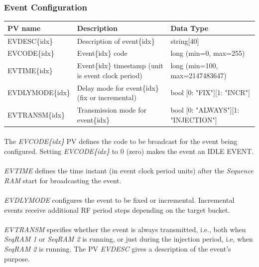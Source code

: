 \documentclass[openany]{article}
\begin{document}
		\subsubsection{Event Configuration}\label{pvgroup:evg-event}
			\begin{center}
			\begin{tabular}{| m{2.8cm} m{6cm} m{6cm} |}
			    \hline
			    \bfseries PV name & \bfseries Description & \bfseries Data Type \\ \hline
			    EVDESC\{idx\} & Description of event\{idx\} & string[40] \\ \hline
			    EVCODE\{idx\} & Event\{idx\} code & long (min=0, max=255) \\ \hline
			    EVTIME\{idx\} & Event\{idx\} timestamp (unit is event clock period) & long (min=100, max=2147483647) \\ \hline
			    EVDLYMODE\{idx\} & Delay mode for event\{idx\} (fix or incremental) & bool [0: "FIX"][1: "INCR"] \\ \hline
			    EVTRANSM\{idx\} & Transmission mode for event\{idx\} & bool [0: "ALWAYS"][1: "INJECTION"] \\ \hline
			\end{tabular}
			\end{center}

			\paragraph{} The \emph{EVCODE\{idx\}} PV defines the code to be broadcast for the event being configured. Setting \emph{EVCODE\{idx\}} to 0 (zero) makes the event an IDLE EVENT.
			\paragraph{} \emph{EVTIME} defines the time instant (in event clock period units) after the \emph{Sequence RAM} start for broadcasting the event.
			\paragraph{} \emph{EVDLYMODE} configures the event to be fixed or incremental. Incremental events receive additional RF period steps depending on the target bucket.
			\paragraph{} \emph{EVTRANSM} specifies whether the event is always transmitted, i.e., both when \emph{SeqRAM 1} or \emph{SeqRAM 2} is running, or just during the injection period, i.e, when \emph{SeqRAM 2} is running. The PV \emph{EVDESC} gives a description of the event's purpose.
\end{document}
